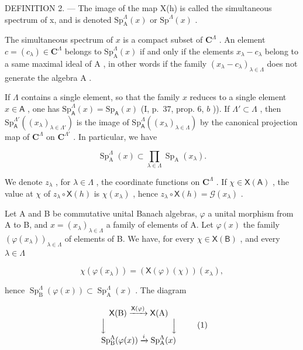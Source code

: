 DEFINITION 2. --- The image of the map X(h) is called the simultaneous spectrum of x, and is denoted \(\mathrm{Sp}_{\mathrm{A}}^{\Lambda}(x)\) or \(\mathrm{Sp}^{\Lambda}(x)\) .

The simultaneous spectrum of \(x\) is a compact subset of \(\mathbf{C}^{\Lambda}\) . An element \(c = (c_{\lambda}) \in \mathbf{C}^{\Lambda}\) belongs to \(\mathrm{Sp}_{\mathrm{A}}^{\Lambda}(x)\) if and only if the elements \(x_{\lambda} - c_{\lambda}\) belong to a same maximal ideal of \(\mathrm{A}\) , in other words if the family \((x_{\lambda} - c_{\lambda})_{\lambda \in \Lambda}\) does not generate the algebra \(\mathrm{A}\) .

If \(\Lambda\) contains a single element, so that the family \(x\) reduces to a single element \(x \in \mathsf{A}\) , one has \(\mathrm{Sp}_{\mathsf{A}}^{\Lambda}(x) = \mathrm{Sp}_{\mathsf{A}}(x)\) (I, p.~37, prop. 6, \(b\) )). If \(\Lambda' \subset \Lambda\) , then \(\mathrm{Sp}_{\mathsf{A}}^{\Lambda'}((x_{\lambda})_{\lambda \in \Lambda'})\) is the image of \(\mathrm{Sp}_{\mathsf{A}}^{\Lambda}((x_{\lambda})_{\lambda \in \Lambda})\) by the canonical projection map of \(\mathbf{C}^{\Lambda}\) on \(\mathbf{C}^{\Lambda'}\) . In particular, we have

\[
\operatorname{Sp} _ {\mathrm{A}} ^ {\Lambda} (x) \subset \prod_ {\lambda \in \Lambda} \operatorname{Sp} _ {\mathrm{A}} (x _ {\lambda}).
\]

We denote \(z_{\lambda}\) , for \(\lambda \in \Lambda\) , the coordinate functions on \(\mathbf{C}^{\Lambda}\) . If \(\chi \in \mathsf{X}(\mathsf{A})\) , the value at \(\chi\) of \(z_{\lambda} \circ \mathsf{X}(h)\) is \(\chi(x_{\lambda})\) , hence \(z_{\lambda} \circ \mathsf{X}(h) = \mathcal{G}(x_{\lambda})\) .

Let A and B be commutative unital Banach algebras, \(\varphi\) a unital morphism from A to B, and \(x = (x_{\lambda})_{\lambda \in \Lambda}\) a family of elements of A. Let \(\varphi(x)\) the family \((\varphi(x_{\lambda}))_{\lambda \in \Lambda}\) of elements of B. We have, for every \(\chi \in \mathsf{X}(\mathsf{B})\) , and every \(\lambda \in \Lambda\)

\[
\chi (\varphi (x _ {\lambda})) = (\mathsf {X} (\varphi) (\chi)) (x _ {\lambda}),
\]

hence \(\operatorname{Sp}_{\mathrm{B}}^{\Lambda}(\varphi(x)) \subset \operatorname{Sp}_{\mathrm{A}}^{\Lambda}(x)\) . The diagram

\[
\begin{array}{c} \mathsf {X} (\mathrm{B}) \xrightarrow {\mathsf {X} (\varphi)} \mathsf {X} (\mathrm{A}) \\ \Big \downarrow \qquad \qquad \qquad \qquad \Big \downarrow \\ \operatorname{Sp} _ {\mathrm{B}} ^ {\Lambda} (\varphi (x)) \xrightarrow {i} \operatorname{Sp} _ {\mathrm{A}} ^ {\Lambda} (x) \end{array}\tag{1}
\]

